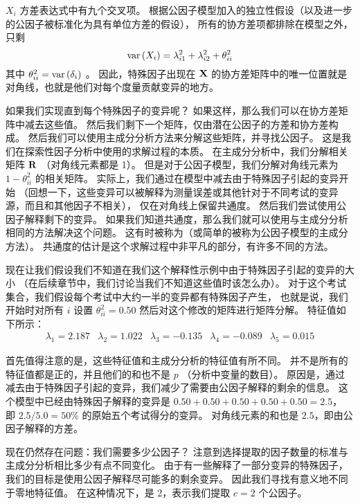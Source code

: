 $ X_i $ 方差表达式中有九个交叉项。
根据公因子模型加入的独立性假设（以及进一步的公因子被标准化为具有单位方差的假设），
所有的协方差项都排除在模型之外，只剩
\begin{equation}
    \mathrm{var}\left({X_i}\right) = \lambda_{i1}^2 + \lambda_{i2}^2 + \theta_{ii}^2
\end{equation}
其中 $ \theta_{ii}^2 = \mathrm{var}\left({\delta_i}\right) $ 。
因此，特殊因子出现在 $ \mathbf{X} $ 的协方差矩阵中的唯一位置就是对角线，也就是他们对每个度量贡献变异的地方。

如果我们实现直到每个特殊因子的变异呢？
如果这样，那么我们可以在协方差矩阵中减去这些值。
然后我们剩下一个矩阵，仅由潜在公因子的方差和协方差构成。
然后我们可以使用主成分分析方法来分解这些矩阵，并寻找公因子。
这是我们在探索性因子分析中使用的求解过程的本质。
在主成分分析中，我们分解相关矩阵 $ \mathbf{R} $ （对角线元素都是 1）。
但是对于公因子模型，我们分解对角线元素为 $ 1 - \theta_{ii}^2 $ 的相关矩阵。
实际上，我们通过在模型中减去由于特殊因子引起的变异开始
（回想一下，这些变异可以被解释为测量误差或其他针对于不同考试的变异源，而且和其他因子不相关），
仅在对角线上保留共通度。
然后我们尝试使用公因子解释剩下的变异。
如果我们知道共通度，那么我们就可以使用与主成分分析相同的方法解决这个问题。
这有时被称为（或简单的被称为公因子模型的主成分方法）。
共通度的估计是这个求解过程中非平凡的部分，有许多不同的方法。

现在让我们假设我们不知道在我们这个解释性示例中由于特殊因子引起的变异的大小
（在后续章节中，我们讨论当我们不知道这些值时该怎么办）。
对于这个考试集合，我们假设每个考试中大约一半的变异都有特殊因子产生，
也就是说，我们开始时对所有 $ i $ 设置 $ \theta_{ii}^2 = 0.50 $ 
然后对这个修改的矩阵进行矩阵分解。
特征值如下所示：
\begin{equation}
    \begin{array}{ccccc}
        \lambda_1 = 2.187 &
        \lambda_2 = 1.022 &
        \lambda_3 = -0.135 &
        \lambda_4 = -0.089 &
        \lambda_5 = 0.015 
    \end{array}
\end{equation}

首先值得注意的是，这些特征值和主成分分析的特征值有所不同。
并不是所有的特征值都是正的，并且他们的和也不是 $ p $ （分析中变量的数目）。
原因是，通过减去由于特殊因子引起的变异，我们减少了需要由公因子解释的剩余的信息。
这个模型中已经由特殊因子解释的变异是 $ 0.50 + 0.50 + 0.50 + 0.50 + 0.50 = 2.5 $，
即 $ 2.5/5.0 = 50\% $ 的原始五个考试得分的变异。
对角线元素的和也是 $ 2.5 $，即由公因子解释的方差。

现在仍然存在问题：我们需要多少公因子？
注意到选择提取的因子数量的标准与主成分分析相比多少有点不同变化。
由于有一些解释了一部分变异的特殊因子，我们的目标是使用公因子解释尽可能多的剩余变异。
因此我们寻找有意义地不同于零地特征值。
在这种情况下，是 2，表示我们提取 $ c = 2 $ 个公因子。

